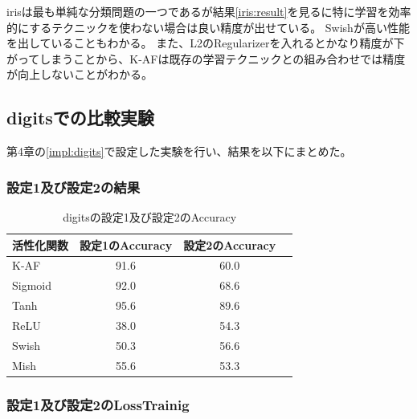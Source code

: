irisは最も単純な分類問題の一つであるが結果\ref{iris:result}を見るに特に学習を効率的にするテクニックを使わない場合は良い精度が出せている。
Swishが高い性能を出していることもわかる。
また、L2のRegularizerを入れるとかなり精度が下がってしまうことから、K-AFは既存の学習テクニックとの組み合わせでは精度が向上しないことがわかる。






\subsection{digitsでの比較実験}
\label{ev:digitsでの比較実験}
第4章の\ref{impl:digits}で設定した実験を行い、結果を以下にまとめた。
\subsubsection{設定1及び設定2の結果}
\label{digits:result}

\begin{table}[htbp]
    \begin{center}
        \caption{digitsの設定1及び設定2のAccuracy}
        \vspace{2mm} 
        \begin{tabular}{l*{2}{c}r}
            活性化関数              & 設定1のAccuracy &  設定2のAccuracy \\
            \hline
            K-AF            & 91.6 & 60.0 \\
            Sigmoid            & 92.0 & 68.6\\
            Tanh            & 95.6 & 89.6 \\
            ReLU        & 38.0 & 54.3 \\
            Swish           & 50.3 & 56.6 \\
            Mish           & 55.6 & 53.3 \\
    
        \end{tabular}
    \end{center}
\end{table}


\subsubsection{設定1及び設定2のLossTrainig}
\label{digits:loss}



